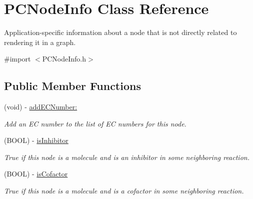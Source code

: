 \hypertarget{interface_p_c_node_info}{
\section{PCNodeInfo Class Reference}
\label{interface_p_c_node_info}
}


Application-\/specific information about a node that is not directly related to rendering it in a graph.  




{\ttfamily \#import $<$PCNodeInfo.h$>$}

\subsection*{Public Member Functions}
\begin{DoxyCompactItemize}
\item 
\hypertarget{interface_p_c_node_info_a396840e27371ac75e1e5210358baa02a}{
(void) -\/ \hyperlink{interface_p_c_node_info_a396840e27371ac75e1e5210358baa02a}{addECNumber:}}
\label{interface_p_c_node_info_a396840e27371ac75e1e5210358baa02a}

\begin{DoxyCompactList}\small\item\em Add an EC number to the list of EC numbers for this node. \end{DoxyCompactList}\item 
\hypertarget{interface_p_c_node_info_a648ddf9fddb48a0639aeaed4ee7c4283}{
(BOOL) -\/ \hyperlink{interface_p_c_node_info_a648ddf9fddb48a0639aeaed4ee7c4283}{isInhibitor}}
\label{interface_p_c_node_info_a648ddf9fddb48a0639aeaed4ee7c4283}

\begin{DoxyCompactList}\small\item\em True if this node is a molecule and is an inhibitor in some neighboring reaction. \end{DoxyCompactList}\item 
\hypertarget{interface_p_c_node_info_ada15c8e425d0e6244975625589dd7cce}{
(BOOL) -\/ \hyperlink{interface_p_c_node_info_ada15c8e425d0e6244975625589dd7cce}{isCofactor}}
\label{interface_p_c_node_info_ada15c8e425d0e6244975625589dd7cce}

\begin{DoxyCompactList}\small\item\em True if this node is a molecule and is a cofactor in some neighboring reaction. \end{DoxyCompactList}\end{DoxyCompactItemize}
